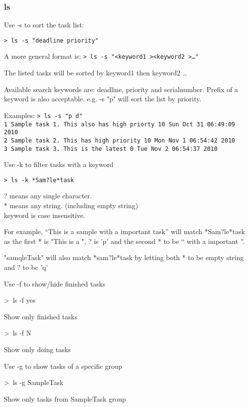 \documentclass[12pt, a4paper]{article}
\begin{document}
\subsubsection{ls}

Use -s to sort the task list:

\texttt{\textgreater \ ls -s "deadline priority"}

A more general format is:
\texttt{\textgreater \ ls -s "\textless keyword1 \textgreater \textless keyword2 \textgreater \ldots"}

The listed tasks will be sorted by keyword1 then keyword2 \ldots
    
Available search keywords are: deadline, priority and serialnumber. Prefix of a keyword is also acceptable. e.g. \textgreaterls -s "p" will sort the list by priority.

Examples:
\texttt{\textgreater \ ls -s "p d"\\
  1   Sample task 1. This also has high priorty   10  Sun Oct 31 06:49:09 2010\\
  2   Sample task 2. This has high priority       10  Mon Nov  1 06:54:42 2010\\
  3   Sample task 3. This is the latest           0   Tue Nov  2 06:54:37 2010}

Use -k to filter tasks with a keyword

\texttt{\textgreater \ ls -k *Sam?le*task}

? means any single character.\\
* means any string. (including empty string)\\
keyword is case insensitive.

For example, ``This is a sample with a important task'' will match *Sam?le*task as the first * is "This is a ", ? is 'p' and the second * to be `` with a important ''.

"samqleTask" will also match *sam?le*task by letting both * to be empty string and ? to be 'q' 

Use -f to show/hide finished tasks

    \textgreater \ ls -f yes

    Show only finished tasks

    \textgreater \ ls -f N

    Show only doing tasks

Use -g to show tasks of a specific group

    \textgreater \ ls -g SampleTask

    Show only tasks from SampleTask group
\end{document}
